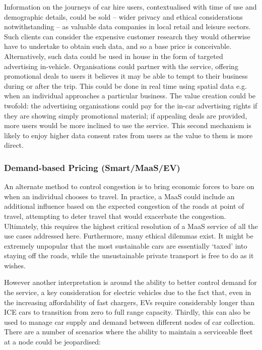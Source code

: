 \documentclass[b5paper,10pt]{article}
\begin{document}
Information on the journeys of car hire users, contextualised with
time of use and demographic details, could be sold -- wider privacy
and ethical considerations notwithstanding -- as valuable data
companies in local retail and leisure sectors. Such clients can
consider the expensive customer research they would otherwise have to
undertake to obtain such data, and so a base price is conceivable.
Alternatively, such data could be used in house in the form of
targeted advertising in-vehicle. Organisations could partner with the
service, offering promotional deals to users it believes it may be
able to tempt to their business during or after the trip. This could
be done in real time using spatial data e.g. when an individual
approaches a particular business. The value creation could be twofold:
the advertising organisations could pay for the in-car advertising
rights if they are showing simply promotional material; if appealing
deals are provided, more users would be more inclined to use the
service. This second mechanism is likely to enjoy higher data consent
rates from users as the value to them is more direct.


\subsubsection{Demand-based Pricing (Smart/MaaS/EV)}

An alternate method to control congestion is to bring economic forces
to bare on when an individual chooses to travel. In practice, a MaaS
could include an additional influence based on the expected congestion
of the roads at point of travel, attempting to deter travel that would
exacerbate the congestion. Ultimately, this requires the highest
critical resolution of a MaaS service of all the use cases addressed
here. Furthermore, many ethical dilemmas exist. It might be extremely
unpopular that the most sustainable cars are essentially `taxed' into
staying off the roads, while the unsustainable private transport is
free to do as it wishes.

However another interpretation is around the ability to better control
demand for the service, a key consideration for electric vehicles due
to the fact that, even in the increasing affordability of fast
chargers, EVs require considerably longer than ICE cars to transition
from zero to full range capacity. Thirdly, this can also be used to
manage car supply and demand between different nodes of car
collection. There are a number of scenarios where the ability to
maintain a serviceable fleet at a node could be jeopardised:
\end{document}
